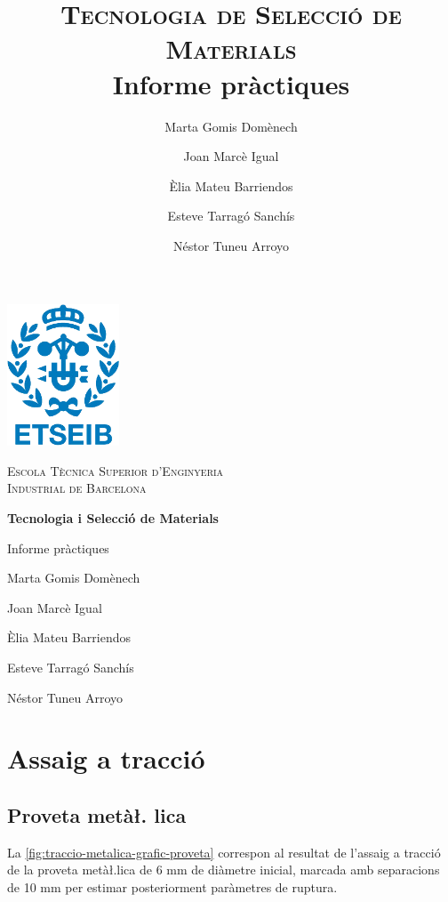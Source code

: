 \documentclass[a4paper]{report}
\title{\textsc{\huge Tecnologia de Selecció de Materials} \\
        Informe pràctiques}
\author{Marta Gomis Domènech \and 
    Joan Marcè Igual \and 
    Èlia Mateu Barriendos \and 
    Esteve Tarragó Sanchís \and 
    Néstor Tuneu Arroyo}
\begin{document}
\begin{titlepage}
    \centering
    \vspace{1cm}
    \includegraphics[width=0.25\textwidth]{images/etseib}
    \par\vspace{1cm}
    \textsc{ \LARGE Escola Tècnica Superior d'Enginyeria \\[1em] 
        Industrial de Barcelona}
    \par\vspace{2cm}
    \textbf{\Huge Tecnologia i Selecció de Materials}
    \par\vspace{2cm}
    {\LARGE Informe pràctiques}
    \vfill
    \begin{flushright}
        \large
        Marta Gomis Domènech \par
        Joan Marcè Igual \par
        Èlia Mateu Barriendos \par
        Esteve Tarragó Sanchís \par
        Néstor Tuneu Arroyo
    \end{flushright}
\end{titlepage}

\tableofcontents

\chapter{Assaig a tracció}

\section{Proveta metà\l. lica }

La \autoref{fig:traccio-metalica-grafic-proveta} correspon al resultat de l’assaig a tracció de la proveta metà\l.lica de 6 mm de diàmetre inicial, marcada amb separacions de 10 mm per estimar posteriorment paràmetres de ruptura. 
\end{document}
